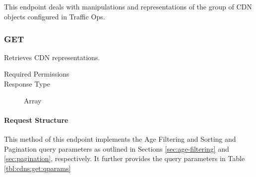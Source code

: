 %
%

\subsection{}
This endpoint deals with manipulations and representations of the group of CDN
objects configured in Traffic Ops.

\subsubsection{GET}
Retrieves CDN representations.
\begin{description}
	\item[Required Permissions] 
	\item[Response Type] Array
\end{description}

\paragraph{Request Structure}
This method of this endpoint implements the Age Filtering and Sorting and
Pagination query parameters as outlined in Sections \ref{sec:age-filtering} and
\ref{sec:pagination}, respectively. It further provides the query parameters in
Table \ref{tbl:cdns:get:qparams}

